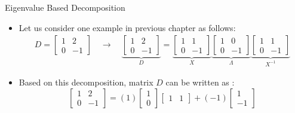 \begin{frame}[t]{Eigenvalue Based Decomposition}
	\begin{itemize}
		\item Let us consider one example in previous chapter as follows:
		\begin{equation*}
			\begin{split}
				D =
				\begin{bmatrix}
					1 & 2 \\ 0 & -1
				\end{bmatrix}
				\quad \rightarrow \quad
				\underbrace{
				\begin{bmatrix}
					1 & 2 \\ 0 & -1
				\end{bmatrix}
				}_D
				=
				\underbrace{
				\begin{bmatrix}
					1 & 1 \\ 0 & -1
				\end{bmatrix}
				}_{X}
				\underbrace{
				\begin{bmatrix}
					1 & 0 \\ 0 & -1
				\end{bmatrix}
				}_{\Lambda}
				\underbrace{
				\begin{bmatrix}
					1 & 1 \\ 0 & -1
				\end{bmatrix}
				}_{X^{-1}}
			\end{split}
		\end{equation*}
		\item Based on this decomposition, matrix $D$ can be written as :
		\begin{equation*}
			\begin{bmatrix}
				1 & 2 \\ 0 & -1
			\end{bmatrix}
			=
			(1)
			\begin{bmatrix}
				1 \\ 0
			\end{bmatrix}
			\begin{bmatrix}
				1 & 1
			\end{bmatrix}
			+
			(-1)
			\begin{bmatrix}
				1 \\ -1
			\end{bmatrix}

\end{equation*}
\end{itemize}
\end{frame}
